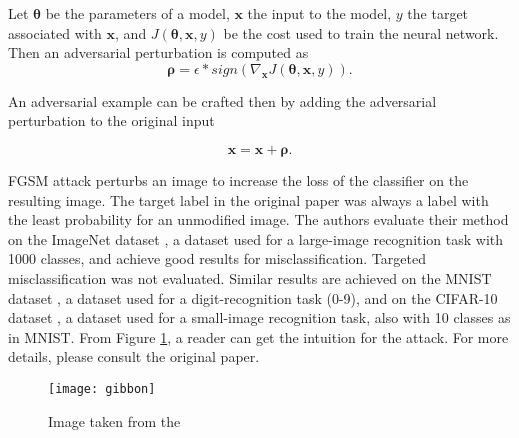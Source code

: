 Let $\pmb \theta$ be the parameters of a model, $\pmb x$ the input to the model, $y$ the target associated with $\pmb x$, and $J (\pmb \theta, \pmb x, y)$ be the cost used to train the neural network. Then an adversarial perturbation is computed as 
\[ 
\pmb \rho = \epsilon * sign (\nabla_{\pmb x} J(\pmb \theta, \pmb x, y)).
\]

An adversarial example can be crafted then by adding the adversarial perturbation to the original input

\[\pmb x = \pmb x + \pmb \rho .\]
 
 
FGSM attack perturbs an image to increase the loss of the classifier on the resulting image. The target label in the original paper \cite{fgsm-original} was always a label with the least probability for an unmodified image. The authors evaluate their method on the ImageNet dataset \cite{datasetImageNet}, a dataset used for a large-image recognition task with 1000 classes, and achieve good results for misclassification. Targeted misclassification was not evaluated. Similar results are achieved on the MNIST dataset 	\cite{datasetMNIST}, a dataset used for a digit-recognition task (0-9), and on the CIFAR-10 dataset \cite{datasetCIFAR10}, a dataset used for a small-image recognition task, also with 10 classes as in MNIST. From Figure \ref{fig:gibbon}, a reader can get the intuition for the attack. For more details, please consult the original paper.

\begin{figure}[h]
\texttt{[image: gibbon]}
\caption{Image taken from the \cite{fgsm-original}}
\label{fig:gibbon}
\end{figure}

